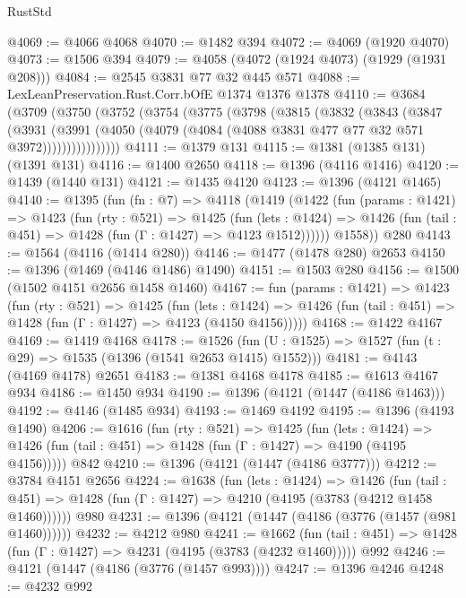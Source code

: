 \begin{lexlean}{RustStd}
\begin{coremodule}
@4069 := @4066 @4068
@4070 := @1482 @394
@4072 := @4069 (@1920 @4070)
@4073 := @1506 @394
@4079 := @4058 (@4072 (@1924 @4073) (@1929 (@1931 @208)))
@4084 := @2545 @3831 @77 @32 @445 @571
@4088 := LexLeanPreservation.Rust.Corr.bOfE @1374 @1376 @1378
@4110 := @3684
    (@3709
      (@3750
        (@3752
          (@3754
            (@3775
              (@3798
                (@3815
                  (@3832
                    (@3843
                      (@3847
                        (@3931
                          (@3991
                            (@4050
                              (@4079 (@4084 (@4088 @3831 @477 @77 @32 @571 @3972))))))))))))))))
@4111 := @1379 @131
@4115 := @1381 (@1385 @131) (@1391 @131)
@4116 := @1400 @2650
@4118 := @1396 (@4116 @1416)
@4120 := @1439 (@1440 @131)
@4121 := @1435 @4120
@4123 := @1396 (@4121 @1465)
@4140 := @1395
    (fun (fn : @7) =>
    @4118
      (@1419
        (@1422
          (fun (params : @1421) =>
          @1423
            (fun (rty : @521) =>
            @1425
              (fun (lets : @1424) =>
              @1426 (fun (tail : @451) => @1428 (fun (Γ : @1427) => @4123 @1512))))))
        @1558))
    @280
@4143 := @1564 (@4116 (@1414 @280))
@4146 := @1477 (@1478 @280) @2653
@4150 := @1396 (@1469 (@4146 @1486) @1490)
@4151 := @1503 @280
@4156 := @1500 (@1502 @4151 @2656 @1458 @1460)
@4167 := fun (params : @1421) =>
  @1423
    (fun (rty : @521) =>
    @1425
      (fun (lets : @1424) =>
      @1426 (fun (tail : @451) => @1428 (fun (Γ : @1427) => @4123 (@4150 @4156)))))
@4168 := @1422 @4167
@4169 := @1419 @4168
@4178 := @1526 (fun (U : @1525) => @1527 (fun (t : @29) => @1535 (@1396 (@1541 @2653 @1415) @1552)))
@4181 := @4143 (@4169 @4178) @2651
@4183 := @1381 @4168 @4178
@4185 := @1613 @4167 @934
@4186 := @1450 @934
@4190 := @1396 (@4121 (@1447 (@4186 @1463)))
@4192 := @4146 (@1485 @934)
@4193 := @1469 @4192
@4195 := @1396 (@4193 @1490)
@4206 := @1616
    (fun (rty : @521) =>
    @1425
      (fun (lets : @1424) =>
      @1426 (fun (tail : @451) => @1428 (fun (Γ : @1427) => @4190 (@4195 @4156)))))
    @842
@4210 := @1396 (@4121 (@1447 (@4186 @3777)))
@4212 := @3784 @4151 @2656
@4224 := @1638
    (fun (lets : @1424) =>
    @1426
      (fun (tail : @451) => @1428 (fun (Γ : @1427) => @4210 (@4195 (@3783 (@4212 @1458 @1460))))))
    @980
@4231 := @1396 (@4121 (@1447 (@4186 (@3776 (@1457 (@981 @1460))))))
@4232 := @4212 @980
@4241 := @1662
    (fun (tail : @451) => @1428 (fun (Γ : @1427) => @4231 (@4195 (@3783 (@4232 @1460)))))
    @992
@4246 := @4121 (@1447 (@4186 (@3776 (@1457 @993))))
@4247 := @1396 @4246
@4248 := @4232 @992

\end{coremodule}
\end{lexlean}
